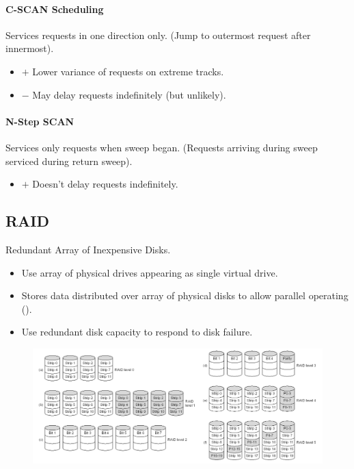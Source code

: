 \documentclass[twocolumn,english]{article}
\let\emph\relax
\begin{document}
\paragraph{C-SCAN Scheduling}

Services requests in one direction only. (Jump to outermost request
after innermost).
\begin{itemize}
\item $+$ Lower variance of requests on extreme tracks.
\item $-$ May delay requests indefinitely (but unlikely).
\end{itemize}

\paragraph{N-Step SCAN}

Services only requests when sweep began. (Requests arriving during
sweep serviced during return sweep).
\begin{itemize}
\item $+$ Doesn't delay requests indefinitely.
\end{itemize}

\subsection{RAID}

Redundant Array of Inexpensive Disks.
\begin{itemize}
\item Use array of physical drives appearing as single virtual drive.
\item Stores data distributed over array of physical disks to allow parallel
operating (\emph{striping}).
\item Use redundant disk capacity to respond to disk failure.
\end{itemize}
\begin{figure}[H]
\centering{}\includegraphics[width=0.95\linewidth]{img/raid}
\end{figure}
\end{document}
